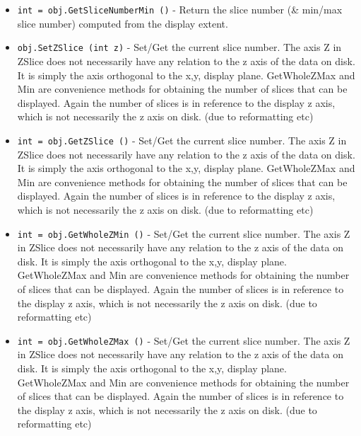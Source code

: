 \begin{itemize}
\item  \verb|int = obj.GetSliceNumberMin ()| -  Return the slice number (\& min/max slice number) computed from the display
 extent.

\item  \verb|obj.SetZSlice (int z)| -  Set/Get the current slice number. The axis Z in ZSlice does not
 necessarily have any relation to the z axis of the data on disk.
 It is simply the axis orthogonal to the x,y, display plane.
 GetWholeZMax and Min are convenience methods for obtaining
 the number of slices that can be displayed. Again the number
 of slices is in reference to the display z axis, which is not
 necessarily the z axis on disk. (due to reformatting etc)

\item  \verb|int = obj.GetZSlice ()| -  Set/Get the current slice number. The axis Z in ZSlice does not
 necessarily have any relation to the z axis of the data on disk.
 It is simply the axis orthogonal to the x,y, display plane.
 GetWholeZMax and Min are convenience methods for obtaining
 the number of slices that can be displayed. Again the number
 of slices is in reference to the display z axis, which is not
 necessarily the z axis on disk. (due to reformatting etc)

\item  \verb|int = obj.GetWholeZMin ()| -  Set/Get the current slice number. The axis Z in ZSlice does not
 necessarily have any relation to the z axis of the data on disk.
 It is simply the axis orthogonal to the x,y, display plane.
 GetWholeZMax and Min are convenience methods for obtaining
 the number of slices that can be displayed. Again the number
 of slices is in reference to the display z axis, which is not
 necessarily the z axis on disk. (due to reformatting etc)

\item  \verb|int = obj.GetWholeZMax ()| -  Set/Get the current slice number. The axis Z in ZSlice does not
 necessarily have any relation to the z axis of the data on disk.
 It is simply the axis orthogonal to the x,y, display plane.
 GetWholeZMax and Min are convenience methods for obtaining
 the number of slices that can be displayed. Again the number
 of slices is in reference to the display z axis, which is not
 necessarily the z axis on disk. (due to reformatting etc)

\end{itemize}
